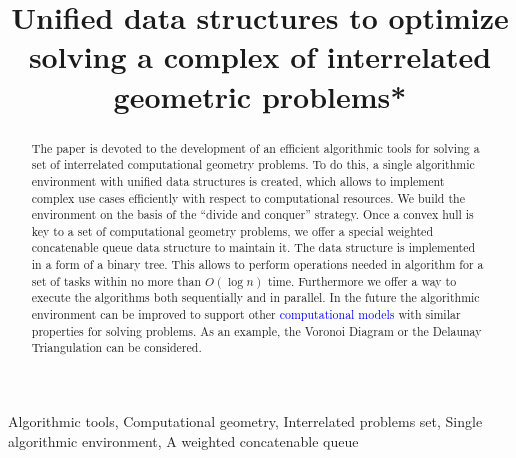\documentclass[conference]{IEEEtran}
\theoremstyle{plane}
\begin{document}
\title{Unified data structures to optimize solving a complex of interrelated geometric problems*\\
}
\author{
\and
{}
}
\maketitle

\begin{abstract}
The paper is devoted to the development of an efficient algorithmic tools for solving a set of interrelated computational geometry problems. To do this, a single algorithmic environment with unified data structures is created, which allows to implement complex use cases efficiently with respect to computational resources. We build the environment on the basis of the ``divide and conquer'' strategy. 
Once a convex hull is key to a set of computational geometry problems, we offer a special weighted concatenable queue data structure to maintain it. The data structure is implemented in a form of a binary tree. This allows to perform operations needed in algorithm for a set of tasks within no more than $O(\log n)$ time. Furthermore we offer a way to execute the algorithms both sequentially and in parallel.
In the future the algorithmic environment can be improved to support other \textcolor{blue}{computational models} with similar properties for solving problems. As an example, the Voronoi Diagram or the Delaunay Triangulation can be considered.
\end{abstract}

\begin{IEEEkeywords}
Algorithmic tools,   Computational geometry, Interrelated problems set, Single algorithmic environment, A weighted concatenable queue
\end{IEEEkeywords}
\end{document}
